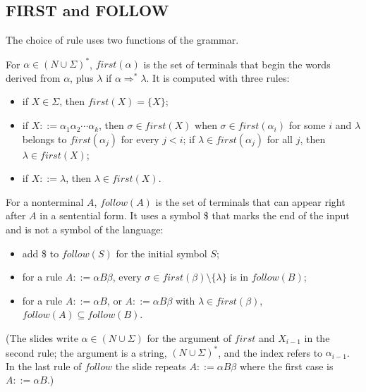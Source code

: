 \subsection{FIRST and FOLLOW}

The choice of rule uses two functions of the grammar.

\begin{definition}
For $\alpha \in (N \cup \Sigma)^*$, $\mathit{first}(\alpha)$ is the set of terminals
that begin the words derived from $\alpha$, plus $\lambda$ if $\alpha \Rightarrow^* \lambda$.
It is computed with three rules:
\begin{itemize}
  \item if $X \in \Sigma$, then $\mathit{first}(X) = \{X\}$;
  \item if $X ::= \alpha_1 \alpha_2 \cdots \alpha_k$, then $\sigma \in \mathit{first}(X)$
    when $\sigma \in \mathit{first}(\alpha_i)$ for some $i$ and $\lambda$ belongs to
    $\mathit{first}(\alpha_j)$ for every $j < i$; if $\lambda \in \mathit{first}(\alpha_j)$
    for all $j$, then $\lambda \in \mathit{first}(X)$;
  \item if $X ::= \lambda$, then $\lambda \in \mathit{first}(X)$.
\end{itemize}
\end{definition}

\begin{definition}
For a nonterminal $A$, $\mathit{follow}(A)$ is the set of terminals that can
appear right after $A$ in a sentential form. It uses a symbol \$ that marks
the end of the input and is not a symbol of the language:
\begin{itemize}
  \item add \$ to $\mathit{follow}(S)$ for the initial symbol $S$;
  \item for a rule $A ::= \alpha B \beta$, every $\sigma \in \mathit{first}(\beta) \setminus \{\lambda\}$
    is in $\mathit{follow}(B)$;
  \item for a rule $A ::= \alpha B$, or $A ::= \alpha B \beta$ with $\lambda \in \mathit{first}(\beta)$,
    $\mathit{follow}(A) \subseteq \mathit{follow}(B)$.
\end{itemize}
\end{definition}

(The slides write $\alpha \in (N \cup \Sigma)$ for the argument of $\mathit{first}$
and $X_{i-1}$ in the second rule; the argument is a string, $(N \cup \Sigma)^*$,
and the index refers to $\alpha_{i-1}$. In the last rule of $\mathit{follow}$ the
slide repeats $A ::= \alpha B \beta$ where the first case is $A ::= \alpha B$.)

